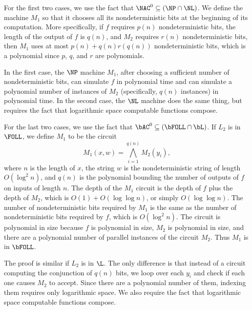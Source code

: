 For the first two cases, we use the fact that $\NAC^0 \subseteq (\NP \cap \NL)$.
We define the machine $M_1$ so that it chooses all its nondeterministic bits at the beginning of its computation.
More specifically, if $f$ requires $p(n)$ nondeterministic bits, the length of the output of $f$ is $q(n)$, and $M_2$ requires $r(n)$ nondeterministic bits, then $M_1$ uses at most $p(n) + q(n) r(q(n))$ nondeterministic bits, which is a polynomial since $p$, $q$, and $r$ are polynomials.

In the first case, the $\NP$ machine $M_1$, after choosing a sufficient number of nondeterministic bits, can simulate $f$ in polynomial time and can simulate a polynomial number of instances of $M_2$ (specifically, $q(n)$ instances) in polynomial time.
In the second case, the $\NL$ machine does the same thing, but requires the fact that logarithmic space computable functions compose.

For the last two cases, we use the fact that $\bAC^0 \subseteq (\bFOLL \cap \bL)$.
If $L_2$ is in $\FOLL$, we define $M_1$ to be the circuit
\begin{equation*}
  M_1(x, w) = \bigwedge_{i = 1}^{q(n)} M_2(y_i),
\end{equation*}
where $n$ is the length of $x$, the string $w$ is the nondeterministic string of length $O(\log^2 n)$, and $q(n)$ is the polynomial bounding the number of outputs of $f$ on inputs of length $n$.
The depth of the $M_1$ circuit is the depth of $f$ plus the depth of $M_2$, which is $O(1) + O(\log \log n)$, or simply $O(\log \log n)$.
The number of nondeterministic bits required by $M_1$ is the same as the number of nondeterministic bits required by $f$, which is $O(\log^2 n)$.
The circuit is polynomial in size because $f$ is polynomial in size, $M_2$ is polynomial in size, and there are a polynomial number of parallel instances of the circuit $M_2$.
Thus $M_1$ is in $\bFOLL$.

The proof is similar if $L_2$ is in $\L$.
The only difference is that instead of a circuit computing the conjunction of $q(n)$ bits, we loop over each $y_i$ and check if each one causes $M_2$ to accept.
Since there are a polynomial number of them, indexing them requires only logarithmic space.
We also require the fact that logarithmic space computable functions compose.
